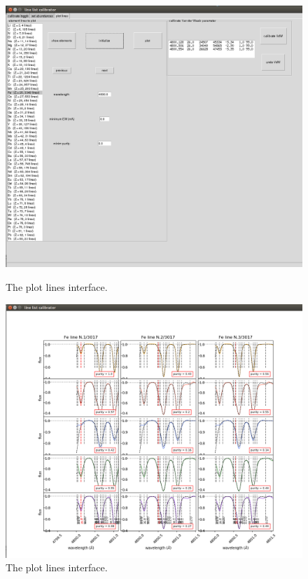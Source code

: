 \documentclass[a4paper,10pt]{article}
\begin{document}
\begin{figure}[h]
\begin{minipage}[t]{14cm}
\centering
\includegraphics[width=12cm]{pics/plot_lines_tab.png}
\caption{The plot lines interface.}

\end{minipage}
\vskip 1cm
\begin{minipage}[t]{14cm}


\centering
\includegraphics[width=12cm]{pics/plot_lines.png}
\caption{The plot lines interface.}
\end{minipage}
\end{figure}



\end{document}
